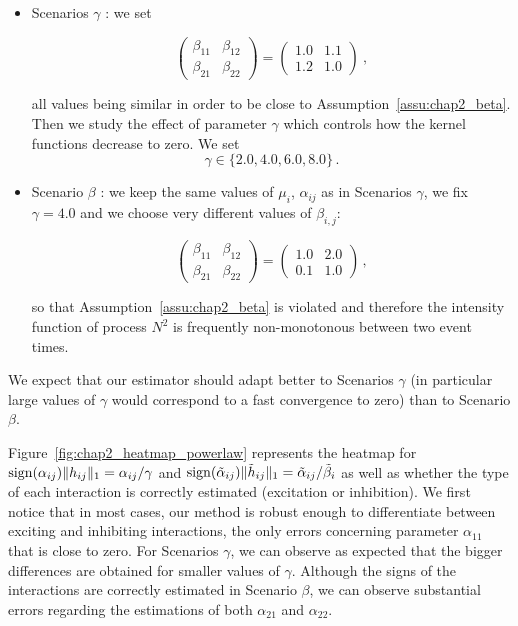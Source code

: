 \begin{itemize}
    \item  Scenarios $\gamma$ : we set
    
    \[\begin{pmatrix}
  \beta_{11} & \beta_{12}\\
  \beta_{21} & \beta_{22}
  \end{pmatrix}=
  \begin{pmatrix}
  1.0 & 1.1\\
  1.2 & 1.0
  \end{pmatrix}\ ,
\]
    
all values being similar in order to be close to Assumption~\ref{assu:chap2_beta}. Then we study the effect of parameter $\gamma$ which controls how the kernel functions decrease to zero. We set \[\gamma\in\{2.0, 4.0, 6.0, 8.0\}\,.\]


    \item Scenario $\beta$ : we keep the same values of $\mu_i$, $\alpha_{ij}$ as in Scenarios $\gamma$, we fix $\gamma=4.0$ and we choose very different values of $\beta_{i,j}$:
    
    
 \[\begin{pmatrix}
  \beta_{11} & \beta_{12}\\
  \beta_{21} & \beta_{22}
  \end{pmatrix}=
  \begin{pmatrix}
  1.0 & 2.0\\
  0.1 & 1.0
  \end{pmatrix}\,,
\]
    
    
    
    so that Assumption~\ref{assu:chap2_beta} is violated and therefore the intensity function of process $N^2$ is frequently non-monotonous between two event times.

\end{itemize}

We expect that our estimator should adapt better to Scenarios $\gamma$ (in particular large values of $\gamma$ would correspond to a fast convergence to zero) than to Scenario $\beta$.

Figure~\ref{fig:chap2_heatmap_powerlaw} represents the heatmap for $\operatorname{sign}(\alpha_{ij})\| h_{ij} \|_1 = \alpha_{ij}/\gamma$ and $\operatorname{sign}(\tilde \alpha_{ij})\| \tilde h_{ij}\|_1 = \tilde \alpha_{ij}/ \tilde\beta_{i}$ as well as whether the type of each interaction is correctly estimated (excitation or inhibition). We first notice that in most cases, our method is robust enough to differentiate between exciting and inhibiting interactions, the only errors concerning parameter $\alpha_{11}$ that is close to zero. For Scenarios $\gamma$, we can observe as expected that the bigger differences are obtained for smaller values of $\gamma$. Although the signs of the interactions are correctly estimated in Scenario $\beta$, we can observe substantial errors regarding the estimations of both $\alpha_{21}$ and $\alpha_{22}$. 

